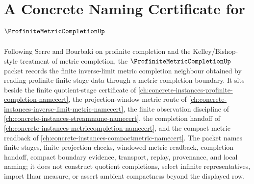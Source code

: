 \chapter{A Concrete Naming Certificate for $\ProfiniteMetricCompletionUp$}
\label{ch:concrete-instances-profinite-metric-completion-namecert}

Following Serre and Bourbaki on profinite completion and the Kelley/Bishop-style treatment of metric completion, the $\ProfiniteMetricCompletionUp$ packet records the finite inverse-limit metric completion neighbour obtained by reading profinite finite-stage data through a metric-completion boundary. It sits beside the finite quotient-stage certificate of \autoref{ch:concrete-instances-profinite-completion-namecert}, the projection-window metric route of \autoref{ch:concrete-instances-inverse-limit-metric-namecert}, the finite observation discipline of \autoref{ch:concrete-instances-streamname-namecert}, the completion handoff of \autoref{ch:concrete-instances-metriccompletion-namecert}, and the compact metric readback of \autoref{ch:concrete-instances-compactmetric-namecert}. The packet names finite stages, finite projection checks, windowed metric readback, completion handoff, compact boundary evidence, transport, replay, provenance, and local naming; it does not construct quotient completions, select infinite representatives, import Haar measure, or assert ambient compactness beyond the displayed row.

